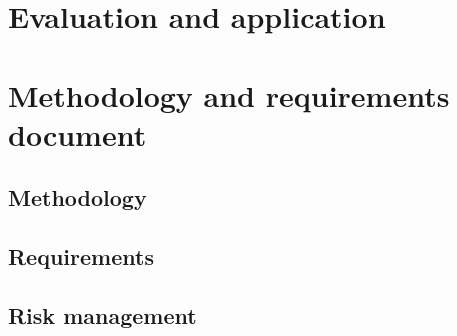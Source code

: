 \documentclass{article}
\begin{document}
\section{Evaluation and application}
\label{sec:eval}


\section{Methodology and requirements document}
\label{sec:methrecdoc}

\subsection{Methodology}
\label{sec:meth}

\subsection{Requirements}
\label{sec:req}


\subsection{Risk management}
\label{sec:riskman}
\end{document}
